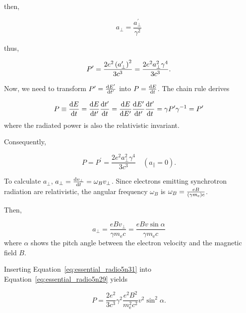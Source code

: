 then,

\begin{equation}\label{eq:essential_radio5n26}
    a_{\perp}=\frac{a_{\perp}^{\prime}}{\gamma^{2}}
\end{equation}

thus,

\begin{equation}\label{eq:essential_radio5n27}
    P^{\prime}=\frac{2 e^{2}\left(a_{\perp}^{\prime}\right)^{2}}{3 c^{3}}=\frac{2 e^{2} a_{\perp}^{2} \gamma^{4}}{3 c^{3}}.
\end{equation}

Now, we need to transform $P' = \frac{\mathrm{d} E'}{\mathrm{d} t'}$ into $P = \frac{\mathrm{d} E}{\mathrm{d} t}$.
The chain rule derives

\begin{equation}\label{eq:essential_radio5n28}
    P \equiv \frac{\mathrm{d} E}{\mathrm{d} t}=\frac{\mathrm{d} E}{\mathrm{d} t^{\prime}} \frac{\mathrm{d} t^{\prime}}{\mathrm{d} t}=\frac{\mathrm{d} E}{\mathrm{d} E^{\prime}} \frac{\mathrm{d} E^{\prime}}{\mathrm{d} t^{\prime}} \frac{\mathrm{d} t^{\prime}}{\mathrm{d} t}=\gamma P^{\prime} \gamma^{-1}=P^{\prime}
\end{equation}
where the radiated power is also the relativistic invariant.

Consequently,

\begin{equation}\label{eq:essential_radio5n29}
    P=P^{\prime}=\frac{2 e^{2} a_{\perp}^{2} \gamma^{4}}{3 c^{3}} \quad\left(a_{\|}=0\right).
\end{equation}

To calculate $a_{\perp}$, $a_{\perp} = \frac{\mathrm{d} v_{\perp}}{\mathrm{d} t} = \omega_B v_{\perp}$.
Since electrons emitting synchrotron radiation are relativistic, the angular frequency $\omega_{B}$ is $\omega_B = \frac{eB}{\left(\gamma m_{\mathrm{e}}\right)c}$.

Then,

\begin{equation}\label{eq:essential_radio5n31}
    a_{\perp}=\frac{e B v_{\perp}}{\gamma m_{\mathrm{e}} c}=\frac{e B v \sin \alpha}{\gamma m_{\mathrm{e}} c}
\end{equation}
where $\alpha$ shows the pitch angle between the electron velocity and the magnetic field $B$.

Inserting Equation~\ref{eq:essential_radio5n31} into Equation~\ref{eq:essential_radio5n29} yields

\begin{equation}\label{eq:essential_radio5n32}
    P=\frac{2 e^{2}}{3 c^{3}} \gamma^{2} \frac{e^{2} B^{2}}{m_{\mathrm{e}}^{2} c^{2}} v^{2} \sin ^{2} \alpha.
\end{equation}

